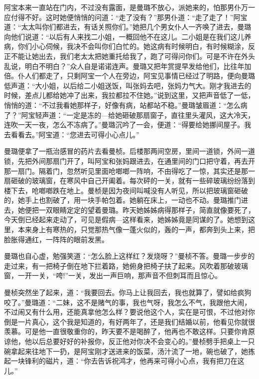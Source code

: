 \par 阿宝本来一直站在门内，不过没有露面，是曼璐不放心，派她来的，怕那男仆万一应付得不好。这时她便悄悄的问道：“走了没有？”那男仆道：“走了走了！”阿宝道：“太太叫你们都进去，有话关照你们。”她把几个男女仆人一齐唤了进去，曼璐向他们说道：“以后有人来找二小姐，一概回他不在这儿。二小姐是在我们这儿养病，你们小心伺候，我决不会叫你们白忙的。她这病有时候明白，有时候糊涂，反正不能让她出去，我们老太太把她重托给我了，跑了可得问你们。可是不许在外头乱说，明白不明白？”众人自是诺诺连声。曼璐又把年赏提早发给他们，比往年加倍。仆人们都走了，只剩阿宝一个人在旁边，阿宝见事情已经过了明路，便向曼璐低声道：“大小姐，以后给二小姐送饭，叫张妈去吧，张妈力气大。刚才我进去的时候，差点儿都给她冲了出来，我拉都拉不住她。”说到这里，又把声音低了一低，悄悄的道：“不过我看她那样子，好像有病，站都站不稳。”曼璐皱眉道：“怎么病了？”阿宝轻声道：“一定是冻的—给她砸破那扇窗子，直往里头灌风，这大冷天，连吹一天一夜，怎么不冻病了。”曼璐沉吟了一会，便道：“得要给她挪间屋子。我去看看去。”阿宝道：“您进去可得小心点儿。”
\par 曼璐便拿了一瓶治感冒的药片去看曼桢。后楼那两间空房，里间一道锁，外间一道锁，先把外间那扇门开了，叫阿宝和张妈跟进去，在通里间的门口把守着，再去开那一扇门。隔着门，忽然听见里面呛啷啷一阵响，不由得吃了一惊，其实还是那一扇砸破的玻璃窗，在寒风中自己开阖着。每次砰的一关，就有一些碎玻璃纷纷落到楼下去，呛啷啷跌在地上。曼桢是因为夜间叫喊没有人听见，所以把玻璃窗砸破的，她手上也割破了，用一块手帕包着。她躺在床上，一动也不动。曼璐推门进去，她便把一双眼睛定定的望着曼璐。昨天她姊姊病得那样子，简直就像要死了，今天倒已经起来走动了，可见是假病—这样看来，她姊姊竟是同谋的了。她想到这里，本来身上有寒热的，只觉那热气像一蓬火似的，轰的一声，都奔到头上来，把脸胀得通红，一阵阵的眼前发黑。
\par 曼璐也自心虚，勉强笑道：“怎么脸上这样红？发烧呀？”曼桢不答。曼璐一步步的走过来，有一把椅子倒在地下拦着路，她俯身把椅子扶了起来。风吹着那破玻璃窗，一开一关，“咵!”一关，发出一声巨响，那声音不但刺耳而且惊心。
\par 曼桢突然坐了起来，道：“我要回去。你马上让我回去，我也就算了，譬如给疯狗咬了。”曼璐道：“二妹，这不是赌气的事，我也气呀，我怎么不气，我跟他大闹，不过闹又有什么用，还能真拿他怎么样？要说他这个人，实在是可恨，不过他对你倒是一片真心，这个我是知道的，有好两年了，还是我们结婚以前，他看见你就很羡慕。可是他一直很敬重你的，昨天要不是喝醉了，他再也不敢这样。只要你肯原谅他，他以后总要好好的补报你，反正他对你决不会变心的。”曼桢劈手把桌上一只碗拿起来往地下一扔，是阿宝刚才送进来的饭菜，汤汁流了一地，碗也破了，她拣起一块锋利的磁片，道：“你去告诉祝鸿才，他再来可得小心点，我有把刀在这儿。”
